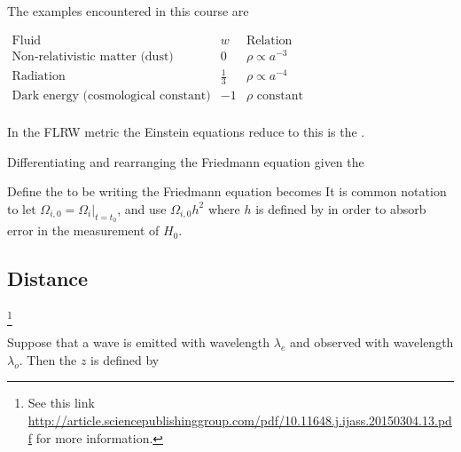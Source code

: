 \documentclass{article}
\begin{document}
The examples encountered in this course are 
\begin{center}$
\begin{array}{ccc}
    \text{Fluid} & w & \text{Relation} \\
    \hline
    \hline
    \text{Non-relativistic matter (dust)} & 0 & \rho\propto a^{-3}  \\
    \text{Radiation} & \frac{1}{3} & \rho\propto a^{-4} \\
    \text{Dark energy (cosmological constant)} & -1 & \rho \text{ constant} \\
\end{array}
$\end{center}

\begin{definition}
In the FLRW metric the Einstein equations reduce to 
this is the . 
\end{definition}

\begin{definition}
Differentiating and rearranging the Friedmann equation given the 
\end{definition}

\begin{definition}
Define the  to be 
writing 
the Friedmann equation becomes 
It is common notation to let $\Omega_{i,0} = \Omega_i |_{t=t_0}$, and use $\Omega_{i,0} h^2$ where $h$ is defined by 
in order to absorb error in the measurement of $H_0$. 
\end{definition}

\subsection{Distance}\footnote{See this link \href{http://article.sciencepublishinggroup.com/pdf/10.11648.j.ijass.20150304.13.pdf}{http://article.sciencepublishinggroup.com/pdf/10.11648.j.ijass.20150304.13.pdf} for more information. }

\begin{definition}[Redshift]
Suppose that a wave is emitted with wavelength $\lambda_e$ and observed with wavelength $ \lambda_o$. Then the  $z$ is defined by 
\end{definition}
\end{document}
